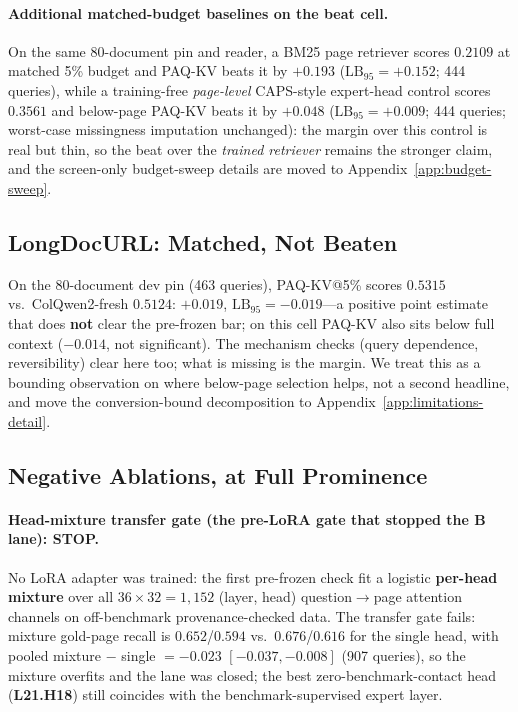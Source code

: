 \documentclass[letterpaper]{article} %
\newcommand{\paqc}{\textsc{PAQ-KV}}
\newcommand{\lb}{\mathrm{LB}_{95}}
\begin{document}
\paragraph{Additional matched-budget baselines on the beat cell.} On the same 80-document pin and reader, a BM25 page retriever scores $0.2109$ at matched 5\% budget and \paqc{} beats it by $+0.193$ ($\lb=+0.152$; 444 queries), while a training-free \emph{page-level} CAPS-style expert-head control scores $0.3561$ and below-page \paqc{} beats it by $+0.048$ ($\lb=+0.009$; 444 queries; worst-case missingness imputation unchanged): the margin over this control is real but thin, so the beat over the \emph{trained retriever} remains the stronger claim, and the screen-only budget-sweep details are moved to Appendix~\ref{app:budget-sweep}.

\subsection{LongDocURL: Matched, Not Beaten}\label{sec:results-longdocurl}

On the 80-document dev pin (463 queries), \paqc{}@5\% scores $0.5315$ vs.\ ColQwen2-fresh $0.5124$: $+0.019$, $\lb=-0.019$---a positive point estimate that does \textbf{not} clear the pre-frozen bar; on this cell \paqc{} also sits below full context ($-0.014$, not significant). The mechanism checks (query dependence, reversibility) clear here too; what is missing is the margin. We treat this as a bounding observation on where below-page selection helps, not a second headline, and move the conversion-bound decomposition to Appendix~\ref{app:limitations-detail}.

\subsection{Negative Ablations, at Full Prominence}\label{sec:results-negatives}

\paragraph{Head-mixture transfer gate (the pre-LoRA gate that stopped the B lane): STOP.} No LoRA adapter was trained: the first pre-frozen check fit a logistic \textbf{per-head mixture} over all $36{\times}32=1{,}152$ (layer, head) question$\to$page attention channels on off-benchmark provenance-checked data. The transfer gate fails: mixture gold-page recall is $0.652$/$0.594$ vs.\ $0.676$/$0.616$ for the single head, with pooled mixture $-$ single $=-0.023$ $[-0.037,-0.008]$ (907 queries), so the mixture overfits and the lane was closed; the best zero-benchmark-contact head (\textbf{L21.H18}) still coincides with the benchmark-supervised expert layer.
\end{document}
